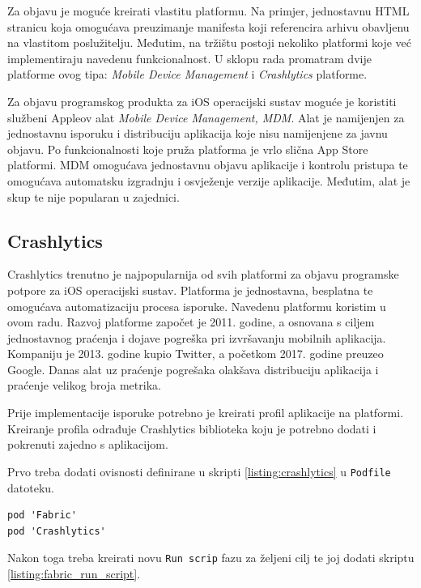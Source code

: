 \documentclass[times, utf8, diplomski, numeric]{fer}
\begin{document}
Za objavu je moguće kreirati vlastitu platformu. Na primjer, jednostavnu HTML stranicu koja omogućava preuzimanje manifesta koji referencira arhivu obavljenu na vlastitom poslužitelju. Međutim, na tržištu postoji nekoliko platformi koje već implementiraju navedenu funkcionalnost. U sklopu rada promatram dvije platforme ovog tipa: \textit{Mobile Device Management} i \textit{Crashlytics} platforme.

Za objavu programskog produkta za iOS operacijski sustav moguće je koristiti službeni Appleov alat \textit{Mobile Device Management, MDM}. Alat je namijenjen za jednostavnu isporuku i distribuciju aplikacija koje nisu namijenjene za javnu objavu. Po funkcionalnosti koje pruža platforma je vrlo slična App Store platformi. MDM omogućava jednostavnu objavu aplikacije i kontrolu pristupa te omogućava automatsku izgradnju i osvježenje verzije aplikacije. Međutim, alat je skup te nije popularan u zajednici.

\subsection{Crashlytics}

Crashlytics trenutno je najpopularnija od svih platformi za objavu programske potpore za iOS operacijski sustav. Platforma je jednostavna, besplatna te omogućava automatizaciju procesa isporuke. Navedenu platformu koristim u ovom radu. Razvoj platforme započet je 2011. godine, a osnovana s ciljem jednostavnog praćenja i dojave pogreška pri izvršavanju mobilnih aplikacija. Kompaniju je 2013. godine kupio Twitter, a početkom 2017. godine preuzeo Google. Danas alat uz praćenje pogrešaka olakšava distribuciju aplikacija i praćenje velikog broja metrika.

Prije implementacije isporuke potrebno je kreirati profil aplikacije na platformi. Kreiranje profila odrađuje Crashlytics biblioteka koju je potrebno dodati i pokrenuti zajedno s aplikacijom.

Prvo treba dodati ovisnosti definirane u skripti \ref{listing:crashlytics} u \verb|Podfile| datoteku.

\begin{lstlisting}[caption=Ovisnosti potrebne za objavu korištenjem Crashlytisc platforme, label=listing:crashlytics]
pod 'Fabric'
pod 'Crashlytics'
\end{lstlisting}

Nakon toga treba kreirati novu \verb|Run scrip| fazu za željeni cilj te joj dodati skriptu \ref{listing:fabric_run_script}.
\end{document}
